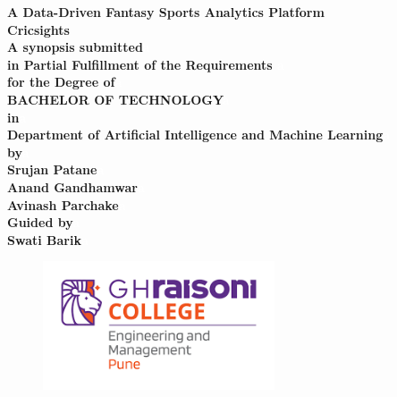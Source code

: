 \begin{center}
\renewcommand{\baselinestretch}{1.8}

{\huge \bf A Data-Driven Fantasy Sports Analytics Platform}\\
\vspace{0.1 in}
{\huge \bf Cricsights}\\
\vspace{0.15 in}
{\small \bf A synopsis submitted\textcolor{white}{a}}\\
\vspace{0.15 in}
{\small \bf in Partial Fulfillment of the Requirements \textcolor{white}{a}}\\ 
\vspace{0.15 in}
{\small \bf for the Degree of\textcolor{white}{a}}\\ 
\vspace{0.15 in}
{\large \bf BACHELOR OF TECHNOLOGY\textcolor{white}{a}}\\ 
\vspace{0.15 in}
{\small \bf in\textcolor{white}{a}}\\ 
\vspace{0.15 in}
{\large \bf Department of Artificial Intelligence and Machine Learning\textcolor{white}{a}}\\ 
\vspace{0.15 in}
{\small \bf by\textcolor{white}{a}}\\ 
\vspace{0.15 in}
{\large \bf Srujan Patane\textcolor{white}{a}}\\ 
\vspace{0.15 in}
{\large \bf Anand Gandhamwar\textcolor{white}{a}}\\ 
\vspace{0.15 in}
{\large \bf Avinash Parchake\textcolor{white}{a}}\\ 
\vspace{0.15 in}
{\small \bf Guided by\textcolor{white}{a}}\\ 
\vspace{0.15 in}
{\large \bf Swati Barik\textcolor{white}{a}}\\ 

\begin{figure}[!h]
\centering
\includegraphics[width=2.7in]{GHRCE_LOGO.png}
\end{figure}


\end{center}
